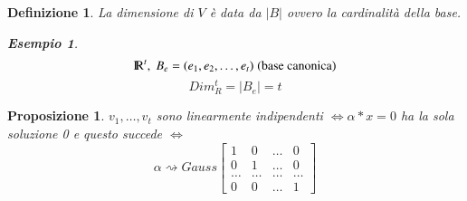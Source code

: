 \documentclass[12pt,a4paper]{article}
\theoremstyle{break}
\newtheorem{definition}{Definizione}[subsection]
\newtheorem{proposition}{Proposizione}[subsection]
\newtheorem{example}{Esempio}[subsection]
\newcommand\R{{\rm I\!R}}
\begin{document}
    \begin{definition}
        La dimensione di $V$ è data da $|B|$ ovvero la cardinalità della base.
        \begin{example}
            \[\R^t,\; B_e = (e_1,e_2,\dots ,e_t)\;(\text{base canonica})\]
            \[Dim_R^t = |B_e| = t\]
        \end{example}
    \end{definition}
    \begin{proposition}
        $v_1,\dots ,v_t$ sono linearmente indipendenti $\Leftrightarrow \alpha *x=0$ ha la sola soluzione 0 e questo succede $\Leftrightarrow$ 
        \[
            \alpha\rightsquigarrow Gauss 
            \left[
                \begin{matrix}
                    1 & 0 & \dots & 0 \\
                    0 & 1 & \dots & 0 \\
                    \dots & \dots & \dots & \dots \\
                    0 & 0 & \dots & 1
                \end{matrix}
            \right]
        \]
    \end{proposition}
\end{document}
